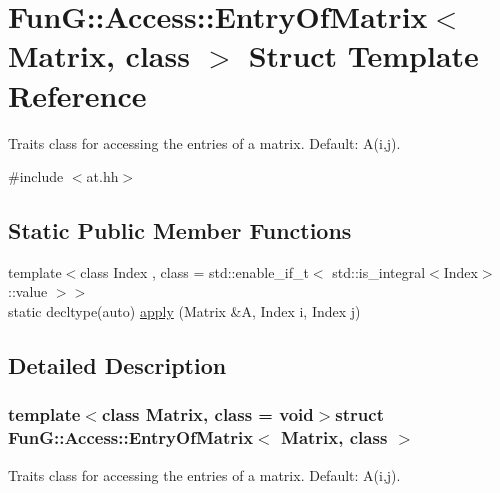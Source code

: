 \hypertarget{structFunG_1_1Access_1_1EntryOfMatrix}{\section{Fun\-G\-:\-:Access\-:\-:Entry\-Of\-Matrix$<$ Matrix, class $>$ Struct Template Reference}
\label{structFunG_1_1Access_1_1EntryOfMatrix}
}


Traits class for accessing the entries of a matrix. Default\-: A(i,j).  




{\ttfamily \#include $<$at.\-hh$>$}

\subsection*{Static Public Member Functions}
\begin{DoxyCompactItemize}
\item 
{\footnotesize template$<$class Index , class  = std\-::enable\-\_\-if\-\_\-t$<$ std\-::is\-\_\-integral$<$\-Index$>$\-::value $>$$>$ }\\static decltype(auto) \hyperlink{structFunG_1_1Access_1_1EntryOfMatrix_af098d041cf120371077e576799599055}{apply} (Matrix \&A, Index i, Index j)
\end{DoxyCompactItemize}


\subsection{Detailed Description}
\subsubsection*{template$<$class Matrix, class = void$>$struct Fun\-G\-::\-Access\-::\-Entry\-Of\-Matrix$<$ Matrix, class $>$}

Traits class for accessing the entries of a matrix. Default\-: A(i,j). 

